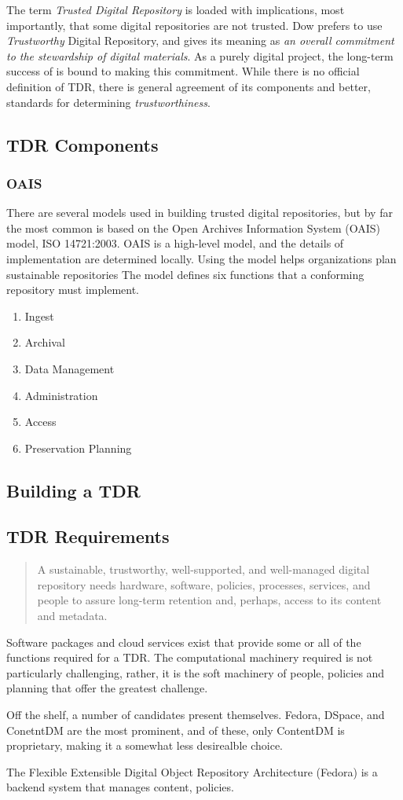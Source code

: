 The term \emph{Trusted Digital Repository} is loaded with implications, most importantly, that some digital repositories are not trusted. Dow prefers to use \emph{Trustworthy} Digital Repository, and gives its meaning as \emph{an overall commitment to the stewardship of digital materials}\cite{dow_elizabeth_2009}. As a purely digital project, the long-term success of \projectname is bound to making this commitment. While there is no official definition\cite{dow_elizabeth_2009} of TDR, there is general agreement of its components and better, standards for determining \emph{trustworthiness}.
\subsection{TDR Components}
\subsubsection{OAIS}
There are several models used in building trusted digital repositories, but by far the most common is based on the Open Archives Information System (OAIS) model, ISO 14721:2003. OAIS is a high-level model, and the details of implementation are determined locally. Using the model helps organizations plan sustainable repositories\cite{harvey} The model defines six functions that a conforming repository must implement.
\begin{enumerate}
  \item{Ingest}
  \item{Archival}
  \item{Data Management}
  \item{Administration}
  \item{Access}
  \item{Preservation Planning}
\end{enumerate}

\subsection{Building a TDR}


\subsection{TDR Requirements}
\begin{quote}A sustainable, trustworthy, well-supported, and well-managed digital repository needs hardware, software, policies, processes, services, and people to assure long-term retention and, perhaps, access to its content and metadata.\cite{dow_elizabeth_2009} \end{quote}
Software packages and cloud services exist that provide some or all of the functions required for a TDR. The computational machinery required is not particularly challenging, rather, it is the soft machinery of people, policies and planning that offer the greatest challenge.

Off the shelf, a number of candidates present themselves. Fedora, DSpace, and ConetntDM are the most prominent, and of these, only ContentDM is proprietary, making it a somewhat less desirealble choice.

The Flexible Extensible Digital Object Repository Architecture (Fedora) is a backend system that manages content, policies. 
